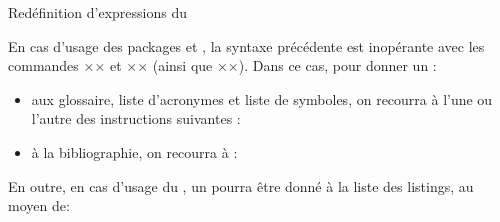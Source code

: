\begin{preamblecode}[title=Par exemple dans le \File{\configurationfile}]
\addto{}
\addto{}
\end{preamblecode}
\begin{table}[hb]
  \centering
  
  \caption{Valeurs et commandes d'expressions \LaTeX{} standard fournies par la \yatcl{}}
  \label{tab:expressions-standard}
\end{table}
\begin{dbexample}{Redéfinition d'expressions du }{}
\begin{preamblecode}[title=Par exemple dans le \File{\configurationfile}]
\addto{}
\addto{}
\end{preamblecode}
\end{dbexample}

En cas d'usage des packages  et , la
syntaxe précédente est inopérante avec les commandes ×\glossaryname× et
×\bibname× (ainsi que ×\refname×). Dans ce cas, pour donner un  :
\begin{itemize}
\item aux glossaire, liste d'acronymes et liste de symboles, on recourra
  à l'une ou l'autre des instructions suivantes :
\begin{bodycode}
\printglossary[title=÷\meta{titre alternatif}÷]
\printglossaries[title=÷\meta{titre alternatif}÷]
\printacronyms[title=÷\meta{titre alternatif}÷]
\printsymbols[title=÷\meta{titre alternatif}÷]
\end{bodycode}
\item à la bibliographie, on recourra à :
\begin{bodycode}
\printbibliography[title=÷\meta{titre alternatif}÷]
\end{bodycode}
\end{itemize}

En outre, en cas d'usage du , un 
pourra être donné à la liste des listings, au moyen de:
\begin{preamblecode}[title=Par exemple dans le \File{\configurationfile}]
\renewcommand\lstlistingname{÷\meta{titre alternatif}÷}
\end{preamblecode}

